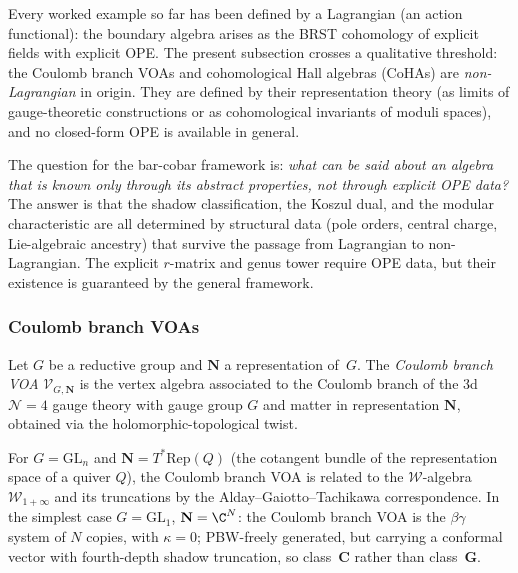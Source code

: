 Every worked example so far has been defined by a Lagrangian
(an action functional): the boundary algebra arises as the BRST
cohomology of explicit fields with explicit OPE. The present
subsection crosses a qualitative threshold: the Coulomb branch VOAs
and cohomological Hall algebras (CoHAs) are \emph{non-Lagrangian}
in origin. They are defined by their representation theory (as limits
of gauge-theoretic constructions or as cohomological invariants of
moduli spaces), and no closed-form OPE is available in general.

The question for the bar-cobar framework is: \emph{what can be said
about an algebra that is known only through its abstract properties,
not through explicit OPE data?} The answer is that the shadow
classification, the Koszul dual, and the modular characteristic are
all determined by structural data (pole orders, central charge,
Lie-algebraic ancestry) that survive the passage from Lagrangian to
non-Lagrangian. The explicit $r$-matrix and genus tower require
OPE data, but their existence is guaranteed by the general framework.

\subsubsection{Coulomb branch VOAs}

\begin{definition}
\label{def:coulomb-branch-voa}
Let $G$ be a reductive group and $\mathbf{N}$ a representation of~$G$.
The \emph{Coulomb branch VOA} $\mathcal{V}_{G,\mathbf{N}}$ is the
vertex algebra associated to the Coulomb branch of the 3d $\mathcal{N}=4$
gauge theory with gauge group $G$ and matter in representation
$\mathbf{N}$, obtained via the holomorphic-topological twist.
\end{definition}

For $G = \mathrm{GL}_n$ and $\mathbf{N} = T^*\mathrm{Rep}(Q)$
(the cotangent bundle of the representation space of a quiver $Q$),
the Coulomb branch VOA is related to the $\mathcal{W}$-algebra
$\mathcal{W}_{1+\infty}$ and its truncations by the
Alday--Gaiotto--Tachikawa correspondence. In the simplest case
$G = \mathrm{GL}_1$, $\mathbf{N} = \C^N$: the Coulomb branch
VOA is the $\beta\gamma$ system of $N$ copies, with
$\kappa = 0$; PBW-freely generated, but carrying a conformal
vector with fourth-depth shadow truncation, so class~$\mathbf{C}$
rather than class~$\mathbf{G}$.

